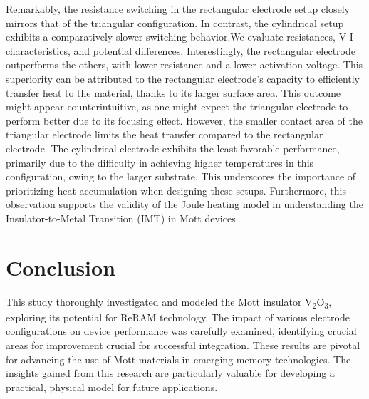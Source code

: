 \documentclass[conference]{IEEEtran}
\begin{document}

Remarkably, the resistance switching in the rectangular electrode setup closely mirrors that of the triangular configuration. In contrast, the cylindrical setup exhibits a comparatively slower switching behavior.We evaluate resistances, V-I characteristics, and potential differences. Interestingly, the rectangular electrode outperforms the others, with lower resistance and a lower activation voltage. This superiority can be attributed to the rectangular electrode’s capacity to efficiently transfer heat to the material, thanks to its larger surface area. This outcome might appear counterintuitive, as one might expect the triangular electrode to perform better due to its focusing effect. However, the smaller contact area of the triangular electrode limits the heat transfer compared to the rectangular electrode.
The cylindrical electrode exhibits the least favorable performance, primarily due to the difficulty in achieving higher temperatures in this configuration, owing to the larger substrate. This underscores the importance of prioritizing heat accumulation when designing these setups. Furthermore, this observation supports the validity of the Joule heating model in understanding the Insulator-to-Metal Transition (IMT) in Mott devices

\section{Conclusion}
This study thoroughly investigated and modeled the Mott insulator V\textsubscript{2}O\textsubscript{3}, exploring its potential for ReRAM technology. The impact of various electrode configurations on device performance was carefully examined, identifying crucial areas for improvement crucial for successful integration. These results are pivotal for advancing the use of Mott materials in emerging memory technologies. The insights gained from this research are particularly valuable for developing a practical, physical model for future applications.
\end{document}
